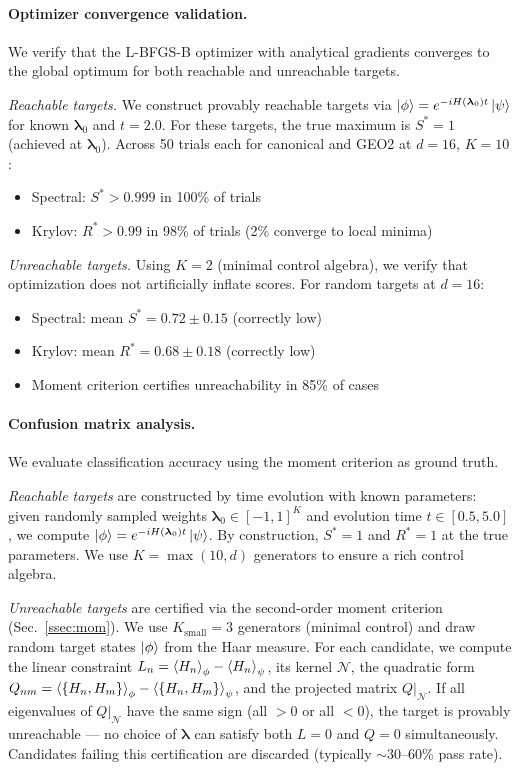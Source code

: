 \documentclass[aps,prx,reprint,superscriptaddress,footnote, twocolumn,notitlepage]{revtex4-2}
\begin{document}
\paragraph{Optimizer convergence validation.}
We verify that the L-BFGS-B optimizer with analytical gradients converges to the global
optimum for both reachable and unreachable targets.

\textit{Reachable targets.} We construct provably reachable targets via
$\ket{\phi} = e^{-iH(\boldsymbol{\lambda}_0)t}\ket{\psi}$ for known $\boldsymbol{\lambda}_0$
and $t = 2.0$. For these targets, the true maximum is $S^* = 1$ (achieved at $\boldsymbol{\lambda}_0$).
Across 50 trials each for canonical and GEO2 at $d = 16$, $K = 10$:
\begin{itemize}
\item Spectral: $S^* > 0.999$ in 100\% of trials
\item Krylov: $R^* > 0.99$ in 98\% of trials (2\% converge to local minima)
\end{itemize}

\textit{Unreachable targets.} Using $K = 2$ (minimal control algebra), we verify that
optimization does not artificially inflate scores. For random targets at $d = 16$:
\begin{itemize}
\item Spectral: mean $S^* = 0.72 \pm 0.15$ (correctly low)
\item Krylov: mean $R^* = 0.68 \pm 0.18$ (correctly low)
\item Moment criterion certifies unreachability in 85\% of cases
\end{itemize}

\paragraph{Confusion matrix analysis.}
We evaluate classification accuracy using the moment criterion as ground truth.

\textit{Reachable targets} are constructed by time evolution with known parameters:
given randomly sampled weights $\boldsymbol{\lambda}_0 \in [-1,1]^K$ and evolution time
$t \in [0.5, 5.0]$, we compute $\ket{\phi} = e^{-iH(\boldsymbol{\lambda}_0)t}\ket{\psi}$.
By construction, $S^* = 1$ and $R^* = 1$ at the true parameters.
We use $K = \max(10, d)$ generators to ensure a rich control algebra.

\textit{Unreachable targets} are certified via the second-order moment criterion
(Sec.~\ref{ssec:mom}). We use $K_{\text{small}} = 3$ generators (minimal control)
and draw random target states $\ket{\phi}$ from the Haar measure.
For each candidate, we compute the linear constraint $L_n = \braket{H_n}_\phi - \braket{H_n}_\psi$,
its kernel $\mathcal{N}$, the quadratic form $Q_{nm} = \braket{\{H_n, H_m\}}_\phi - \braket{\{H_n, H_m\}}_\psi$,
and the projected matrix $Q|_{\mathcal{N}}$. If all eigenvalues of $Q|_{\mathcal{N}}$ have
the same sign (all $> 0$ or all $< 0$), the target is provably unreachable --- no choice of
$\boldsymbol{\lambda}$ can satisfy both $L = 0$ and $Q = 0$ simultaneously.
Candidates failing this certification are discarded (typically $\sim$30--60\% pass rate).
\end{document}
